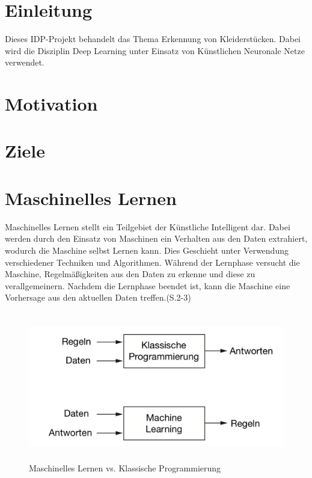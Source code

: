 \documentclass[12pt,titlepage]{article}
\begin{document}
\newpage
\tableofcontents
\newpage

\section{Einleitung}

Dieses IDP-Projekt behandelt das Thema Erkennung von Kleiderstücken. Dabei wird die Disziplin Deep Learning unter Einsatz von Künstlichen Neuronale Netze verwendet.

\section{Motivation}



\section{Ziele}

\section{Maschinelles Lernen}

Maschinelles Lernen stellt ein Teilgebiet der Künstliche Intelligent dar. Dabei werden durch den Einsatz von Maschinen ein Verhalten aus den Daten extrahiert, wodurch die Maschine selbst Lernen kann. Dies Geschieht unter Verwendung verschiedener Techniken und Algorithmen. Während der Lernphase versucht die Maschine, Regelmäßigkeiten aus den Daten zu erkenne und diese zu verallgemeinern. Nachdem die Lernphase beendet ist, kann die Maschine eine Vorhersage aus den aktuellen Daten treffen.\cite{Frochte2021}(S.2-3)\\

\begin{figure}[ht]
	\centering
  \includegraphics[width=15cm, height=6.5cm]{Abbildung_MaschinellesLernen_1.jpg}
	\caption{Maschinelles Lernen vs. Klassische Programmierung}
	\label{fig1}
\end{figure}
\end{document}
